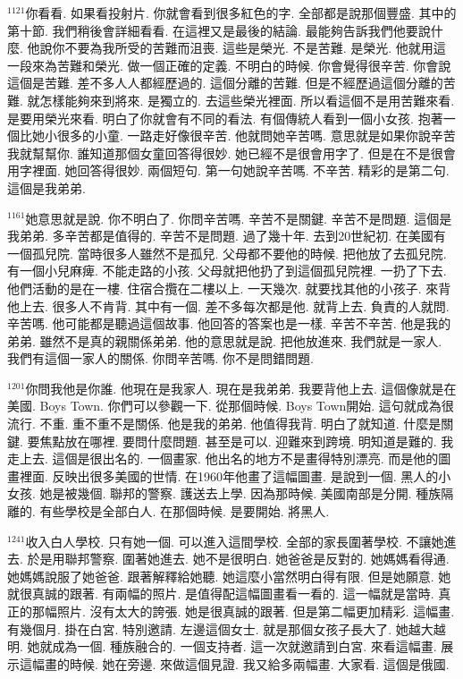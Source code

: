 \documentclass{book}
\begin{document}
$^{1121}$你看看.
如果看投射片.
你就會看到很多紅色的字.
全部都是說那個豐盛.
其中的第十節.
我們稍後會詳細看看.
在這裡又是最後的結論.
最能夠告訴我們他要說什麼.
他說你不要為我所受的苦難而沮喪.
這些是榮光.
不是苦難.
是榮光.
他就用這一段來為苦難和榮光.
做一個正確的定義.
不明白的時候.
你會覺得很辛苦.
你會說這個是苦難.
差不多人人都經歷過的.
這個分離的苦難.
但是不經歷過這個分離的苦難.
就怎樣能夠來到將來.
是獨立的.
去這些榮光裡面.
所以看這個不是用苦難來看.
是要用榮光來看.
明白了你就會有不同的看法.
有個傳統人看到一個小女孩.
抱著一個比她小很多的小童.
一路走好像很辛苦.
他就問她辛苦嗎.
意思就是如果你說辛苦我就幫幫你.
誰知道那個女童回答得很妙.
她已經不是很會用字了.
但是在不是很會用字裡面.
她回答得很妙.
兩個短句.
第一句她說辛苦嗎.
不辛苦.
精彩的是第二句.
這個是我弟弟.

$^{1161}$她意思就是說.
你不明白了.
你問辛苦嗎.
辛苦不是關鍵.
辛苦不是問題.
這個是我弟弟.
多辛苦都是值得的.
辛苦不是問題.
過了幾十年.
去到20世紀初.
在美國有一個孤兒院.
當時很多人雖然不是孤兒.
父母都不要他的時候.
把他放了去孤兒院.
有一個小兒麻痺.
不能走路的小孩.
父母就把他扔了到這個孤兒院裡.
一扔了下去.
他們活動的是在一樓.
住宿合攬在二樓以上.
一天幾次.
就要找其他的小孩子.
來背他上去.
很多人不肯背.
其中有一個.
差不多每次都是他.
就背上去.
負責的人就問.
辛苦嗎.
他可能都是聽過這個故事.
他回答的答案也是一樣.
辛苦不辛苦.
他是我的弟弟.
雖然不是真的親關係弟弟.
他的意思就是說.
把他放進來.
我們就是一家人.
我們有這個一家人的關係.
你問辛苦嗎.
你不是問錯問題.

$^{1201}$你問我他是你誰.
他現在是我家人.
現在是我弟弟.
我要背他上去.
這個像就是在美國.
Boys Town.
你們可以參觀一下.
從那個時候.
Boys Town開始.
這句就成為很流行.
不重.
重不重不是關係.
他是我的弟弟.
他值得我背.
明白了就知道.
什麼是關鍵.
要焦點放在哪裡.
要問什麼問題.
甚至是可以.
迎難來到跨境.
明知道是難的.
我走上去.
這個是很出名的.
一個畫家.
他出名的地方不是畫得特別漂亮.
而是他的圖畫裡面.
反映出很多美國的世情.
在1960年他畫了這幅圖畫.
是說到一個.
黑人的小女孩.
她是被幾個.
聯邦的警察.
護送去上學.
因為那時候.
美國南部是分開.
種族隔離的.
有些學校是全部白人.
在那個時候.
是要開始.
將黑人.

$^{1241}$收入白人學校.
只有她一個.
可以進入這間學校.
全部的家長圍著學校.
不讓她進去.
於是用聯邦警察.
圍著她進去.
她不是很明白.
她爸爸是反對的.
她媽媽看得通.
她媽媽說服了她爸爸.
跟著解釋給她聽.
她這麼小當然明白得有限.
但是她願意.
她就很真誠的跟著.
有兩幅的照片.
是值得配這幅圖畫看一看的.
這一幅就是當時.
真正的那幅照片.
沒有太大的誇張.
她是很真誠的跟著.
但是第二幅更加精彩.
這幅畫.
有幾個月.
掛在白宮.
特別邀請.
左邊這個女士.
就是那個女孩子長大了.
她越大越明.
她就成為一個.
種族融合的.
一個支持者.
這一次就邀請到白宮.
來看這幅畫.
展示這幅畫的時候.
她在旁邊.
來做這個見證.
我又給多兩幅畫.
大家看.
這個是俄國.
\end{document}
